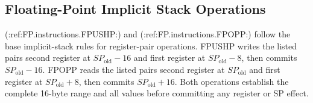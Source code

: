 \subsection{Floating-Point Implicit Stack Operations}
(:ref:FP.instructions.FPUSHP:) and (:ref:FP.instructions.FPOPP:) follow the base implicit-stack rules for
register-pair operations. FPUSHP writes the
listed pair\textquotesingle{}s second register at \(SP_{\mathrm{old}}-16\) and first register at
\(SP_{\mathrm{old}}-8\), then commits \(SP_{\mathrm{old}}-16\). FPOPP reads the listed pair\textquotesingle{}s second
register at \(SP_{\mathrm{old}}\) and first register at \(SP_{\mathrm{old}}+8\), then commits
\(SP_{\mathrm{old}}+16\). Both operations establish the complete 16-byte range and all values before committing any
register or SP effect.
